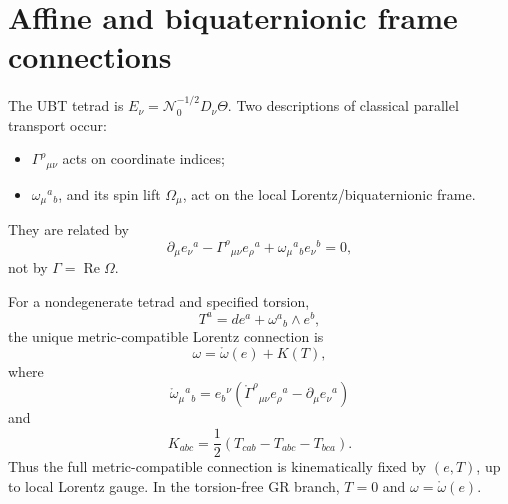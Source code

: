 
\section{Affine and biquaternionic frame connections}
\label{sec:canonical:connection}

The UBT tetrad is $E_\nu=\mathcal N_0^{-1/2}D_\nu\Theta$.  Two descriptions of
classical parallel transport occur:
\begin{itemize}
 \item $\Gamma^\rho{}_{\mu\nu}$ acts on coordinate indices;
 \item $\omega_\mu{}^a{}_b$, and its spin lift $\Omega_\mu$, act on the local
       Lorentz/biquaternionic frame.
\end{itemize}
They are related by
\[
 \partial_\mu e_\nu{}^a-\Gamma^\rho{}_{\mu\nu}e_\rho{}^a
 +\omega_\mu{}^a{}_b e_\nu{}^b=0,
\]
not by $\Gamma=\operatorname{Re}\Omega$.

For a nondegenerate tetrad and specified torsion,
\[
 T^a=de^a+\omega^a{}_b\wedge e^b,
\]
the unique metric-compatible Lorentz connection is
\[
 \boxed{\omega=\mathring\omega(e)+K(T)},
\]
where
\[
 \mathring\omega_\mu{}^a{}_b
 =e_b{}^\nu(\mathring\Gamma^\rho{}_{\mu\nu}e_\rho{}^a
 -\partial_\mu e_\nu{}^a)
\]
and
\[
 K_{abc}=\frac12(T_{cab}-T_{abc}-T_{bca}).
\]
Thus the full metric-compatible connection is kinematically fixed by $(e,T)$,
up to local Lorentz gauge.  In the torsion-free GR branch, $T=0$ and
$\omega=\mathring\omega(e)$.

